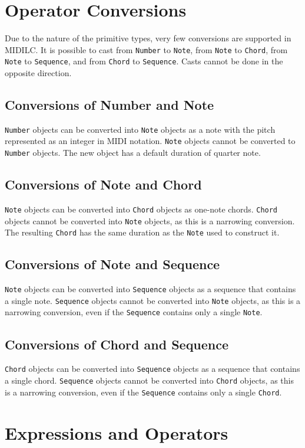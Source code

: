 \documentclass[12pt,A4]{book}
\begin{document}
\section{Operator Conversions}
Due to the nature of the primitive types, very few conversions are supported in MIDILC. It is possible to cast from \verb|Number| to \verb|Note|, from \verb|Note| to \verb|Chord|, from \verb|Note| to \verb|Sequence|, and from \verb|Chord| to \verb|Sequence|. Casts cannot be done in the opposite direction.
\subsection{Conversions of Number and Note}
\verb|Number| objects can be converted into \verb|Note| objects as a note with the pitch represented as an integer in MIDI notation. \verb|Note| objects cannot be converted to \verb|Number| objects. The new object has a default duration of quarter note.
\subsection{Conversions of Note and Chord}
\verb|Note| objects can be converted into \verb|Chord| objects as one-note chords. \verb|Chord| objects cannot be converted into \verb|Note| objects, as this is a narrowing conversion. The resulting \verb|Chord| has the same duration as the \verb|Note| used to construct it.
\subsection{Conversions of Note and Sequence}
\verb|Note| objects can be converted into \verb|Sequence| objects as a sequence that contains a single note. \verb|Sequence| objects cannot be converted into \verb|Note| objects, as this is a narrowing conversion, even if the \verb|Sequence| contains only a single \verb|Note|.
\subsection{Conversions of Chord and Sequence}
\verb|Chord| objects can be converted into \verb|Sequence| objects as a sequence that contains a single chord. \verb|Sequence| objects cannot be converted into \verb|Chord| objects, as this is a narrowing conversion, even if the \verb|Sequence| contains only a single \verb|Chord|.
\section{Expressions and Operators}
\end{document}
